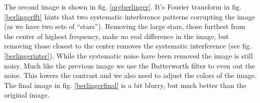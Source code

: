 \documentclass[a4paper, 10pt, final]{article}
\begin{document}
The second image is shown in fig. \ref{orgberlinger}. It's Fourier
transform in fig. \ref{berlingerfft} hints that two systematic
interference patterns corrupting the image (as we have two sets of
``stars''). Removing the large stars, those furthest from the center of
highest frequency, make no real difference in the image, but removing
those closest to the center removes the systematic interference (see
fig. \ref{berlingerinter}). While the systematic noise have been removed
the image is still noisy. Much like the previous image we use the
Butterworth filter to even out the noise. This lowers the contrast and
we also need to adjust the colors of the image. The final image in fig.
\ref{berlingerfinal} is a bit blurry, but much better than the original
image.

\begin{figure}[!h]
    \centering
    \hspace{1em}
    \hspace{1em}
    \\

\end{figure}
\end{document}
